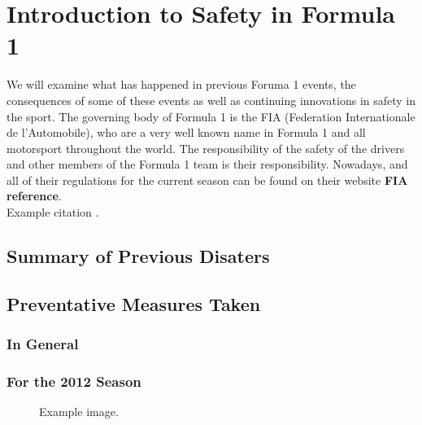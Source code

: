 \documentclass[12pt]{article} %
\begin{document}
\section{Introduction to Safety in Formula 1} %

We will examine what has happened in previous Foruma 1 events, the consequences of some of these events as well as
continuing innovations in safety in the sport. The governing body of Formula 1 is the FIA (Federation Internationale de l'Automobile), who are a very well known name in Formula 1 and all motorsport throughout the world. The responsibility of the safety of the drivers and other members of the Formula 1 team is their responsibility. Nowadays, and all of their regulations for the current season can be found on their website {\bf FIA reference}.\\
Example citation \cite{Figueredo:2009dg}.\\


\subsection{Summary of Previous Disaters} %

\lipsum[1] %


\subsection{Preventative Measures Taken} %
\subsubsection{In General}
\lipsum[2] %
\subsubsection{For the 2012 Season}
\lipsum[3] %

\begin{figure}[H] %
\caption{Example image.}
\label{fig:speciation}
\end{figure}
\end{document}
